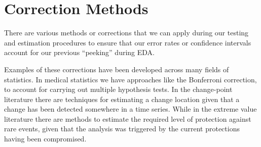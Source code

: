 \documentclass[
  letterpaper,
  DIV=11,
  numbers=noendperiod]{scrreprt}
\begin{document}
\section{Correction Methods}\label{correction-methods}

There are various methods or corrections that we can apply during our
testing and estimation procedures to ensure that our error rates or
confidence intervals account for our previous ``peeking'' during EDA.

Examples of these corrections have been developed across many fields of
statistics. In medical statistics we have approaches like the Bonferroni
correction, to account for carrying out multiple hypothesis tests. In
the change-point literature there are techniques for estimating a change
location given that a change has been detected somewhere in a time
series. While in the extreme value literature there are methods to
estimate the required level of protection against rare events, given
that the analysis was triggered by the current protections having been
compromised.
\end{document}
